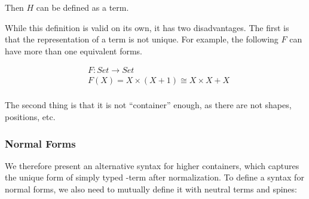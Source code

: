 Then $H$ can be defined as a term. \hyperref[htm]{\faCog}

While this definition is valid on its own, it has two disadvantages. The first is that the representation of a term is not unique. For example, the following $F$ can have more than one equivalent forms.

\begin{align*}
& F : Set \to Set \\
& F (X) = X \times (X + 1) \cong X \times X + X \\
\end{align*}

The second thing is that it is not ``container'' enough, as there are not shapes, positions, etc.

\subsubsection*{Normal Forms}

We therefore present an alternative syntax for higher containers, which captures the unique form of simply typed \lambda-term after normalization. To define a syntax for normal forms, we also need to mutually define it with neutral terms and spines:

\begin{code}[hide]%
\>[0]\<%
\end{code}

